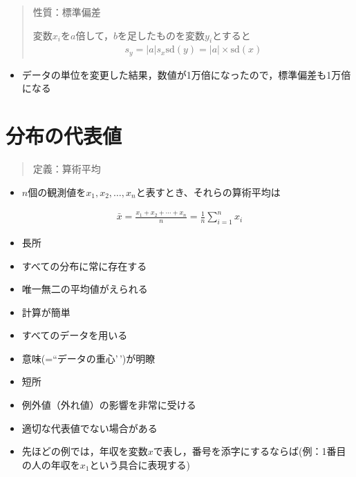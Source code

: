 \documentclass[
]{book}
\providecommand{\tightlist}{%
  \setlength{\itemsep}{0pt}\setlength{\parskip}{0pt}}
\theoremstyle{definition}
\theoremstyle{definition}
\theoremstyle{definition}
\theoremstyle{definition}
\theoremstyle{remark}
\begin{document}
\begin{quote}
性質：標準偏差

変数\(x_i\)を\(a\)倍して，\(b\)を足したものを変数\(y_i\)とすると
\begin{eqnarray*}
s_y=|a| s_x
\text{sd}(y)=|a| \times \text{sd}(x)
\end{eqnarray*}
\end{quote}

\begin{itemize}
\tightlist
\item
  データの単位を変更した結果，数値が1万倍になったので，標準偏差も1万倍になる
\end{itemize}

\hypertarget{ux5206ux5e03ux306eux4ee3ux8868ux5024-1}{%
\chapter{分布の代表値}\label{ux5206ux5e03ux306eux4ee3ux8868ux5024-1}}

\begin{quote}
定義：算術平均
\end{quote}

\begin{itemize}
\tightlist
\item
  \(n\)個の観測値を\(x_1,x_2,\dots,x_n\)と表すとき、それらの算術平均は
\end{itemize}

\begin{align*}
\bar{x}=\frac{x_1+x_2+\cdots+x_n}{n}=\frac{1}{n}\sum_{i=1}^n x_i
\end{align*}

\begin{itemize}
\item
  長所
\item
  すべての分布に常に存在する
\item
  唯一無二の平均値がえられる
\item
  計算が簡単
\item
  すべてのデータを用いる
\item
  意味(=``データの重心'\,')が明瞭
\item
  短所
\item
  例外値（外れ値）の影響を非常に受ける
\item
  適切な代表値でない場合がある
\item
  先ほどの例では，年収を変数\(x\)で表し，番号を添字にするならば(例：1番目の人の年収を\(x_1\)という具合に表現する)
\end{itemize}
\end{document}
